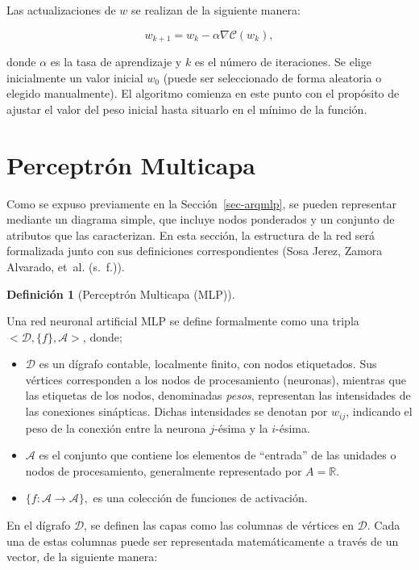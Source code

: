 \documentclass[
  us-letterpaper,
]{scrreprt}
\theoremstyle{plain}
\theoremstyle{definition}
\theoremstyle{plain}
\theoremstyle{definition}
\newtheorem{definition}{Definición}[chapter]
\theoremstyle{remark}
\begin{document}
Las actualizaciones de \(w\) se realizan de la siguiente manera:

\[w_{k+1} = w_k - \alpha \nabla\mathcal C(w_k),\]

donde \(\alpha\) es la tasa de aprendizaje y \(k\) es el número de
iteraciones. Se elige inicialmente un valor inicial \(w_0\) (puede ser
seleccionado de forma aleatoria o elegido manualmente). El algoritmo
comienza en este punto con el propósito de ajustar el valor del peso
inicial hasta situarlo en el mínimo de la función.

\section{Perceptrón Multicapa}\label{perceptruxf3n-multicapa}

Como se expuso previamente en la Sección~\ref{sec-arqmlp}, se pueden
representar mediante un diagrama simple, que incluye nodos ponderados y
un conjunto de atributos que las caracterizan. En esta sección, la
estructura de la red será formalizada junto con sus definiciones
correspondientes (Sosa Jerez, Zamora Alvarado, et~al. (s.~f.)).

\begin{definition}[Perceptrón Multicapa
(MLP)]\protect\hypertarget{def-mlp}{}\label{def-mlp}

Una red neuronal artificial MLP se define formalmente como una tripla
\(<\mathscr D, \{f\}, \mathscr A>\), donde;

\begin{itemize}
\item
  \(\mathscr D\) es un dígrafo contable, localmente finito, con nodos
  etiquetados. Sus vértices corresponden a los nodos de procesamiento
  (neuronas), mientras que las etiquetas de los nodos, denominadas
  \emph{pesos}, representan las intensidades de las conexiones
  sinápticas. Dichas intensidades se denotan por \(w_{ij}\), indicando
  el peso de la conexión entre la neurona \(j\)-ésima y la \(i\)-ésima.
\item
  \(\mathscr A\) es el conjunto que contiene los elementos de
  ``entrada'' de las unidades o nodos de procesamiento, generalmente
  representado por \(A =\mathbb R\).
\item
  \(\{f: \mathscr A\to\mathscr A\},\) es una colección de funciones de
  activación.
\end{itemize}

\end{definition}

En el dígrafo \(\mathscr D\), se definen las capas como las columnas de
vértices en \(\mathscr D\). Cada una de estas columnas puede ser
representada matemáticamente a través de un vector, de la siguiente
manera:
\end{document}
